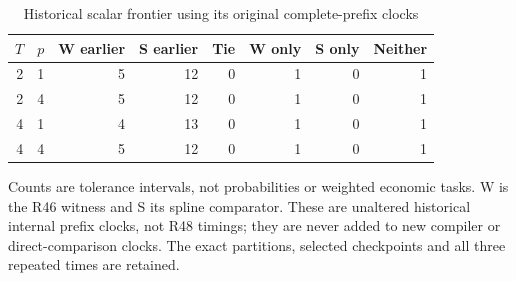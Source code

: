 \begin{table}[htbp]
\centering
\caption{Historical scalar frontier using its original complete-prefix clocks}\label{tab:historical-clock48}
\footnotesize
\begin{tabular}{rrrrrrrr}
\toprule
$T$ & $p$ & W earlier & S earlier & Tie & W only & S only & Neither\\
\midrule
2 & 1 & 5 & 12 & 0 & 1 & 0 & 1 \\
2 & 4 & 5 & 12 & 0 & 1 & 0 & 1 \\
4 & 1 & 4 & 13 & 0 & 1 & 0 & 1 \\
4 & 4 & 5 & 12 & 0 & 1 & 0 & 1 \\
\bottomrule
\end{tabular}
\begin{minipage}{0.97\linewidth}\footnotesize\vspace{3pt}
Counts are tolerance intervals, not probabilities or weighted economic tasks. W is the R46 witness and S its spline comparator. These are unaltered historical internal prefix clocks, not R48 timings; they are never added to new compiler or direct-comparison clocks. The exact partitions, selected checkpoints and all three repeated times are retained.
\end{minipage}
\end{table}
